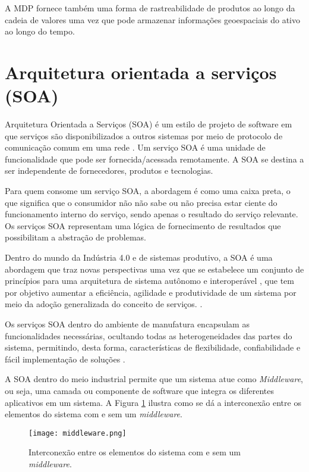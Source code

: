 	A MDP fornece também uma forma de rastreabilidade de produtos ao longo da cadeia de valores uma vez que pode armazenar informações geoespaciais do ativo ao longo do tempo.


\section{Arquitetura orientada a serviços (SOA)}
	
	Arquitetura Orientada a Serviços (SOA) é um estilo de projeto de software em que serviços são disponibilizados a outros sistemas por meio de protocolo de comunicação comum em uma rede \cite{bell2008soa}. Um serviço SOA é uma unidade de funcionalidade que pode ser fornecida/acessada remotamente. A SOA se destina a ser independente de fornecedores, produtos e tecnologias.
	
	Para quem consome um serviço SOA, a abordagem é como uma caixa preta, o que significa que o consumidor não não sabe ou não precisa estar ciente do funcionamento interno do serviço, sendo apenas o resultado do serviço relevante. Os serviços SOA representam uma lógica de fornecimento de resultados que possibilitam a abstração de problemas.
	
	Dentro do mundo da Indústria 4.0 e de sistemas produtivo, a SOA é uma abordagem que	traz novas perspectivas uma vez que se estabelece um conjunto de princípios para uma arquitetura de sistema autônomo e interoperável \cite{candido2009soa}, que tem por objetivo aumentar a eficiência, agilidade e produtividade de um sistema por meio da adoção generalizada do conceito de serviços. \cite{souit2013soa}.
	
	Os serviços SOA dentro do ambiente de manufatura encapsulam as funcionalidades necessárias, ocultando todas as heterogeneidades das partes do sistema, permitindo, desta forma, características de flexibilidade, confiabilidade e fácil implementação de	soluções \cite{groba2008soa}.
	
	A SOA dentro do meio industrial permite que um sistema atue como \textit{Middleware}, ou seja, uma camada ou componente de software que integra os diferentes aplicativos em um sistema. A Figura \ref{fig:middleware} ilustra como se dá a interconexão entre os elementos do sistema com e sem um \textit{middleware}.
	
	\begin{figure}[hbt!]
		\centering
		\caption{Interconexão entre os elementos do sistema com e sem um \textit{middleware}.}
		\texttt{[image: middleware.png]}
		\label{fig:middleware}
	\end{figure}


